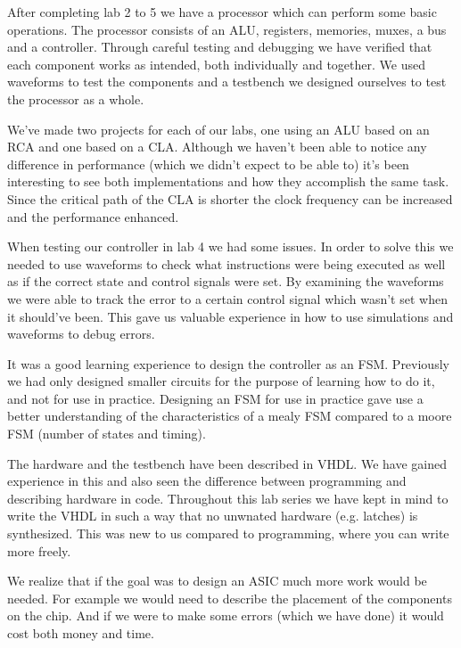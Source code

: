 \documentclass[a4paper,11pt]{article}
\begin{document}
After completing lab 2 to 5 we have a processor which can perform some basic operations. The processor consists of an ALU, registers, memories, muxes, a bus and a controller. Through careful testing and debugging we have verified that each component works as intended, both individually and together. We used waveforms to test the components and a testbench we designed ourselves to test the processor as a whole.

We've made two projects for each of our labs, one using an ALU based on an RCA and one based on a CLA. Although we haven't been able to notice any difference in performance (which we didn't expect to be able to) it's been interesting to see both implementations and how they accomplish the same task. Since the critical path of the CLA is shorter the clock frequency can be increased and the performance enhanced.
 
When testing our controller in lab 4 we had some issues. In order to solve this we needed to use waveforms to check what instructions were being executed as well as if the correct state and control signals were set. By examining the waveforms we were able to track the error to a certain control signal which wasn't set when it should've been. This gave us valuable experience in how to use simulations and waveforms to debug errors.

It was a good learning experience to design the controller as an FSM. Previously we had only designed smaller circuits for the purpose of learning how to do it, and not for use in practice. Designing an FSM for use in practice gave use a better understanding of the characteristics of a mealy FSM compared to a moore FSM (number of states and timing).

The hardware and the testbench have been described in VHDL. We have gained experience in this and also seen the difference between programming and describing hardware in code. Throughout this lab series we have kept in mind to write the VHDL in such a way that no unwnated  hardware (e.g. latches) is synthesized. This was new to us compared to programming, where you can write more freely.

We realize that if the goal was to design an ASIC much more work would be needed. For example we would need to describe the placement of the components on the chip. And if we were to make some errors (which we have done) it would cost both money and time.
\end{document}
